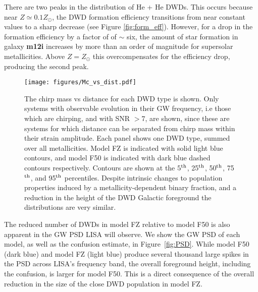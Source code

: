 \documentclass[twocolumn, linenumbers]{aastex631}
\begin{document}
There are two peaks in the distribution of He + He DWDs. This occurs because near $Z\simeq 0.1Z_\odot$, the DWD formation efficiency transitions from near constant values to a sharp decrease (see Figure \ref{fig:form_eff}). However, for a drop in the formation efficiency by a factor of of $\sim$ six, the amount of star formation in galaxy \textbf{m12i} increases by more than an order of magnitude for supersolar metallicities. Above $Z=Z_\odot$ this overcompensates for the efficiency drop, producing the second peak.


\begin{figure*}
	\texttt{[image: figures/Mc\_vs\_dist.pdf]}
    \caption{The chirp mass vs distance for each DWD type is shown. Only systems with observable evolution in their GW frequency, i.e those which are chirping, and with SNR $>7$, are shown, since these are systems for which distance can be separated from chirp mass within their strain amplitude. Each panel shows one DWD type, summed over all metallicities. Model FZ is indicated with solid light blue contours, and model F50 is indicated with dark blue dashed contours respectively. Contours are shown at the $5^{\rm{th}}$, 25$^{\rm{th}}$, 50$^{\rm{th}}$, 75$^{\rm{th}}$, and 95$^{\rm{th}}$ percentiles. Despite intrinsic changes to population properties induced by a metallicity-dependent binary fraction, and a reduction in the height of the DWD Galactic foreground the distributions are very similar.}
    \label{fig:Mc_vs_dist}
\end{figure*}


The reduced number of DWDs in model FZ relative to model F50 is also apparent in the GW PSD LISA will observe. We show the GW PSD of each model, as well as the confusion estimate, in Figure~\ref{fig:PSD}. While model F50 (dark blue) and model FZ (light blue) produce several thousand large spikes in the PSD across LISA's frequency band, the overall foreground height, including the confusion, is larger for model F50. This is a direct consequence of the overall reduction in the size of the close DWD population in model FZ. 
\end{document}

